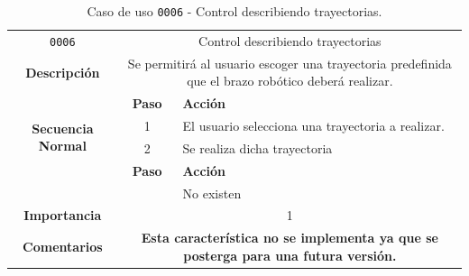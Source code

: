 \begin{table}[H]
    \centering
    \begin{tabularx}{\textwidth}{|c|c|X|}
        \cline{1-3}
        \texttt{0006}        & \multicolumn{2}{c|}{Control describiendo trayectorias}                                      
        \\ \cline{1-3}
        \textbf{Descripción} & \multicolumn{2}{m{13cm}|}{Se permitirá al usuario escoger una trayectoria predefinida que el brazo robótico deberá realizar.}
        \\ \cline{1-3}
        \multirow{4}{*}{\textbf{Secuencia Normal}} & \textbf{Paso} & \textbf{Acción}
        \\ \cline{2-3}                    &   1  & El usuario selecciona una trayectoria a realizar.
        \\ \cline{2-3}                    &   2  & Se realiza dicha trayectoria
        \\ \cline{1-3}
        \multirow{2}{*}{\textbf{Excepciones}} & \textbf{Paso} & \textbf{Acción}
        \\ \cline{2-3}                    &      &  No existen
        \\ \cline{1-3}
        \textbf{Importancia}                 & \multicolumn{2}{c|}{1}           
        \\ \cline{1-3}
        \textbf{Comentarios}                 & \multicolumn{2}{m{13cm}|}{\textbf{Esta característica no se implementa ya que se posterga para una futura versión.}}
        \\ \cline{1-3}
    \end{tabularx}
    \caption{Caso de uso \texttt{0006} - Control describiendo trayectorias.}
    \label{tab:CU0006}
    \label{tab:caso_de_uso_control_describiendo_trayectorias}
\end{table}


